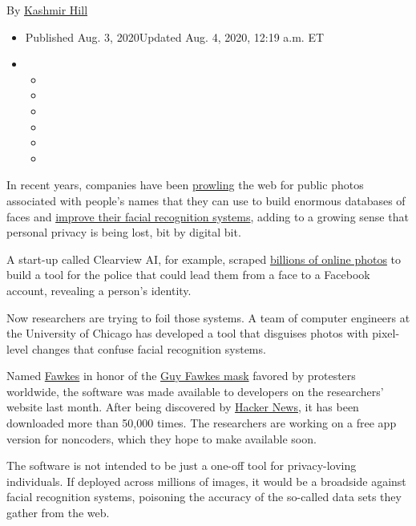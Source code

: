 By \href{https://www.nytimes3xbfgragh.onion/by/kashmir-hill}{Kashmir
Hill}

\begin{itemize}
\item
  Published Aug. 3, 2020Updated Aug. 4, 2020, 12:19 a.m. ET
\item
  \begin{itemize}
  \item
  \item
  \item
  \item
  \item
  \item
  \end{itemize}
\end{itemize}

In recent years, companies have been
\href{https://onezero.medium.com/this-simple-facial-recognition-search-engine-can-track-you-down-across-the-internet-518c7129e454}{prowling}
the web for public photos associated with people's names that they can
use to build enormous databases of faces and
\href{https://www.nytimes3xbfgragh.onion/interactive/2019/10/11/technology/flickr-facial-recognition.html}{improve
their facial recognition systems}, adding to a growing sense that
personal privacy is being lost, bit by digital bit.

A start-up called Clearview AI, for example, scraped
\href{https://www.nytimes3xbfgragh.onion/2020/01/18/technology/clearview-privacy-facial-recognition.html}{billions
of online photos} to build a tool for the police that could lead them
from a face to a Facebook account, revealing a person's identity.

Now researchers are trying to foil those systems. A team of computer
engineers at the University of Chicago has developed a tool that
disguises photos with pixel-level changes that confuse facial
recognition systems.

Named \href{http://sandlab.cs.uchicago.edu/fawkes/}{Fawkes} in honor of
the
\href{https://www.nytimes3xbfgragh.onion/2019/11/05/opinion/guy-fawkes-day-v-for-vendetta.html}{Guy
Fawkes mask} favored by protesters worldwide, the software was made
available to developers on the researchers' website last month. After
being discovered by
\href{https://news.ycombinator.com/item?id=23917337}{Hacker News}, it
has been downloaded more than 50,000 times. The researchers are working
on a free app version for noncoders, which they hope to make available
soon.

The software is not intended to be just a one-off tool for
privacy-loving individuals. If deployed across millions of images, it
would be a broadside against facial recognition systems, poisoning the
accuracy of the so-called data sets they gather from the web.

